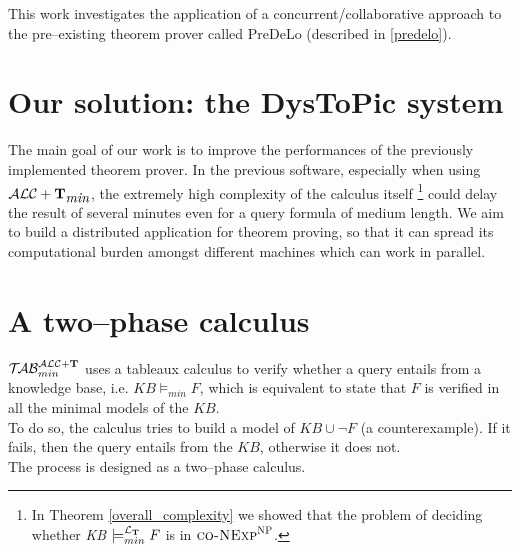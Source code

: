 \documentclass[a4paper, 11pt, oneside]{duthesis}
\newcommand{\tip}{{\bf T}}
\newcommand{\alctmin}{\mathcal{ALC}+\tip_{\mbox{\em min}}}
\newcommand{\unione} {\cup}
\newcommand{\ellet} {\mathcal{L}_{\bf T}}
\newcommand{\nuovoc}{\mathrel{{\mathcal{T}\!\mathcal{AB}}}_{min}^{\mathcal{ALC}+\mbox{\scriptsize $\tip$}}}
\begin{document}
This work investigates the application of a concurrent/collaborative approach to the pre--existing theorem prover called PreDeLo (described in \ref{predelo}).




\section{Our solution: the DysToPic system}



The main goal of our work is to improve the performances of the previously implemented theorem prover.
In the previous software, especially when using $\alctmin$, the extremely high complexity of the calculus itself
\footnote{In Theorem \ref{overall_complexity} we showed that the problem of deciding whether \emph{KB} $\models_{min}^{\ellet} F$ is in $\textsc{co-NExp}^\textsc{NP}$.}
could delay the result of several minutes even for a query formula of medium length.
We aim to build a distributed application for theorem proving, so that it can spread its computational burden amongst different machines which can work in parallel.

\section{A two--phase calculus}\label{calc_2ph}

$\nuovoc$ uses a tableaux calculus to verify whether a query entails from a knowledge base, i.e. $KB \models_{min} F$, which is equivalent to state that $F$ is verified in all the minimal models of the $KB$.\\
To do so, the calculus tries to build a model of $KB \unione \neg F$ (a counterexample). If it fails, then the query entails from the $KB$, otherwise it does not.\\

The process is designed as a two--phase calculus.
\end{document}
